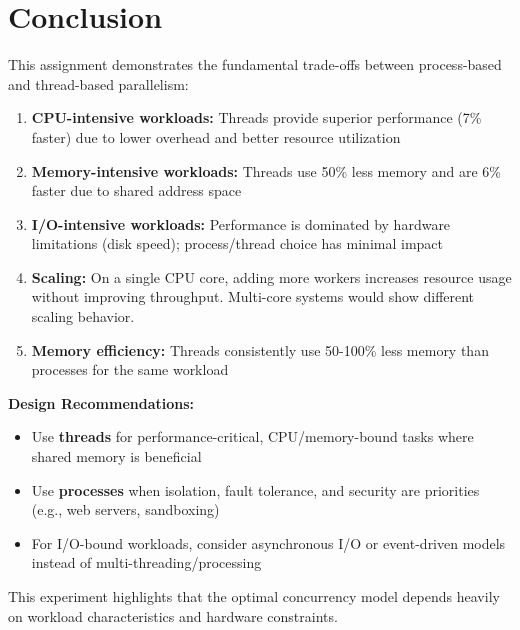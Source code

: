 \documentclass[12pt,a4paper]{article}
\begin{document}
\section{Conclusion}

This assignment demonstrates the fundamental trade-offs between process-based 
and thread-based parallelism:

\begin{enumerate}
    \item \textbf{CPU-intensive workloads:} Threads provide superior performance 
    (7\% faster) due to lower overhead and better resource utilization
    
    \item \textbf{Memory-intensive workloads:} Threads use 50\% less memory and are
    6\% faster due to shared address space
    
    \item \textbf{I/O-intensive workloads:} Performance is dominated by hardware 
    limitations (disk speed); process/thread choice has minimal impact
    
    \item \textbf{Scaling:} On a single CPU core, adding more workers increases
    resource usage without improving throughput. Multi-core systems would show
    different scaling behavior.
    
    \item \textbf{Memory efficiency:} Threads consistently use 50-100\% less memory
    than processes for the same workload
\end{enumerate}

\textbf{Design Recommendations:}
\begin{itemize}
    \item Use \textbf{threads} for performance-critical, CPU/memory-bound tasks
    where shared memory is beneficial
    \item Use \textbf{processes} when isolation, fault tolerance, and security
    are priorities (e.g., web servers, sandboxing)
    \item For I/O-bound workloads, consider asynchronous I/O or event-driven models
    instead of multi-threading/processing
\end{itemize}

This experiment highlights that the optimal concurrency model depends heavily on
workload characteristics and hardware constraints.
\end{document}
